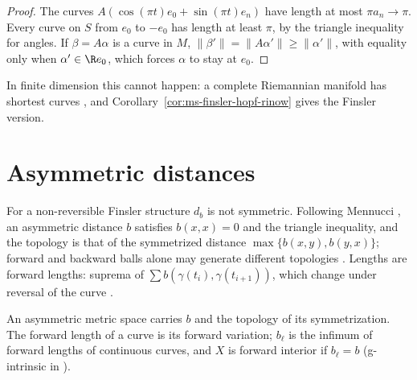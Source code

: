 \begin{proof}
  \leanok
  The curves $A(\cos(\pi t) e_0 + \sin(\pi t) e_n)$ have length at most $\pi a_n \to \pi$. Every
  curve on $S$ from $e_0$ to $-e_0$ has length at least $\pi$, by the triangle inequality for angles.
  If $\beta = A\alpha$ is a curve in $M$, $\|\beta'\| = \|A\alpha'\| \geq \|\alpha'\|$, with equality
  only when $\alpha' \in \R e_0$, which forces $\alpha$ to stay at $e_0$.
\end{proof}

In finite dimension this cannot happen: a complete Riemannian manifold has shortest curves
\cite[Cor.~10.4.3]{Lar26}, and Corollary~\ref{cor:ms-finsler-hopf-rinow} gives the Finsler
version.

\section{Asymmetric distances}
\label{sec:ms-asymmetric}

For a non-reversible Finsler structure $d_b$ is not symmetric. Following Mennucci \cite{Men13},
an asymmetric distance $b$ satisfies $b(x, x) = 0$ and the triangle inequality, and the topology is
that of the symmetrized distance $\max\{b(x, y), b(y, x)\}$; forward and backward balls alone may
generate different topologies \cite[Example~4.1]{Men13}. Lengths are forward lengths: suprema of
$\sum b(\gamma(t_i), \gamma(t_{i+1}))$, which change under reversal of the curve
\cite[Remark~3.5]{Men13}.

\begin{definition}
  \label{def:ms-asymm}
  \leanok
  An asymmetric metric space carries $b$ and the topology of its symmetrization. The forward
  length of a curve is its forward variation; $b_\ell$ is the infimum of forward lengths of
  continuous curves, and $X$ is forward interior if $b_\ell = b$ (g-intrinsic in
  \cite[Def.~3.16]{Men13}).
\end{definition}


